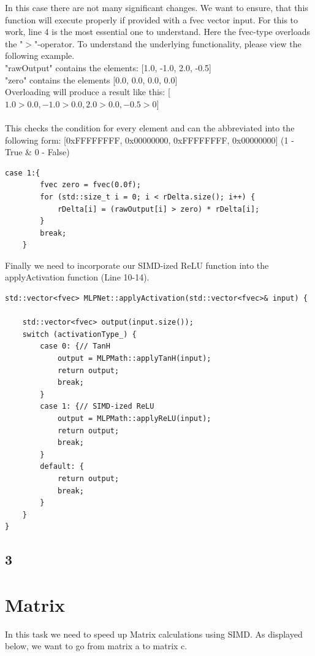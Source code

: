\documentclass{article}
\begin{document}
\noindent In this case there are not many significant changes.
We want to ensure, that this function will execute properly if provided with a fvec vector input.
For this to work, line 4 is the most essential one to understand. Here the fvec-type overloads the "$>$"-operator.
To understand the underlying functionality, please view the following example. \\

\noindent "rawOutput" contains the elements: [1.0, -1.0, 2.0, -0.5] \\
"zero" contains the elements [0.0, 0.0, 0.0, 0.0] \\

\noindent Overloading will produce a result like this:
[$1.0>0.0,-1.0>0.0,2.0>0.0,-0.5>0$] \\\\
\noindent This checks the condition for every element and can the abbreviated into the following form: [0xFFFFFFFF, 0x00000000, 0xFFFFFFFF, 0x00000000]
(1 - True \& 0 - False)

\begin{lstlisting}[caption=backPropActivation]
    case 1:{
        fvec zero = fvec(0.0f);
        for (std::size_t i = 0; i < rDelta.size(); i++) {
            rDelta[i] = (rawOutput[i] > zero) * rDelta[i];
        }
        break;
    }
\end{lstlisting}

\newpage

\noindent Finally we need to incorporate our SIMD-ized ReLU function into the applyActivation function (Line 10-14).
\begin{lstlisting}[caption=applyActivation]
    std::vector<fvec> MLPNet::applyActivation(std::vector<fvec>& input) {

    std::vector<fvec> output(input.size());
    switch (activationType_) {
        case 0: {// TanH
            output = MLPMath::applyTanH(input);
            return output;
            break;
        }
        case 1: {// SIMD-ized ReLU
            output = MLPMath::applyReLU(input);
            return output;
            break;
        }
        default: {
            return output;
            break;
        }
    }
}
\end{lstlisting}


\subsection*{3}

\section{Matrix}
In this task we need to speed up Matrix calculations using SIMD.
As displayed below, we want to go from matrix a to matrix c.
\end{document}
